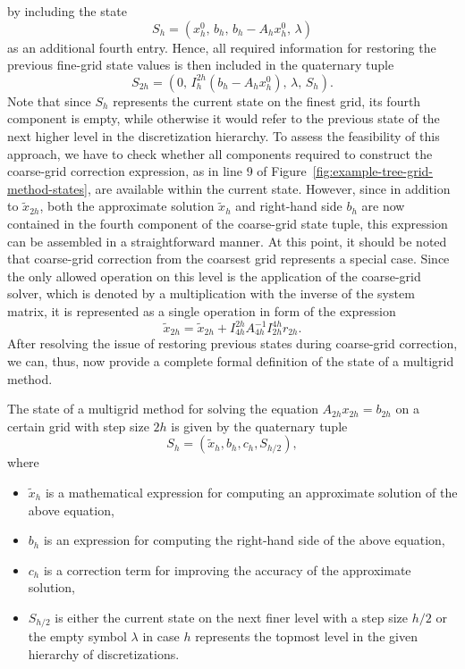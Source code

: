 by including the state 
\begin{equation*}
S_h = (x_{h}^0, \, b_h, \, b_{h} - A_h x_{h}^0, \, \lambda) 
\end{equation*} 
as an additional fourth entry. 
Hence, all required information for restoring the previous fine-grid state values is then included in the quaternary tuple 
\begin{equation*}
	S_{2h} = (0, \, I_{h}^{2h}(b_{h} - A_h x_{h}^0), \, \lambda, \, S_h).
\end{equation*}
Note that since $S_h$ represents the current state on the finest grid, its fourth component is empty, while otherwise it would refer to the previous state of the next higher level in the discretization hierarchy.
To assess the feasibility of this approach, we have to check whether all components required to construct the coarse-grid correction expression, as in line 9 of Figure~\ref{fig:example-tree-grid-method-states}, are available within the current state.
However, since in addition to $\tilde{x}_{2h}$, both the approximate solution $\tilde{x}_h$ and right-hand side $b_h$ are now contained in the fourth component of the coarse-grid state tuple, this expression can be assembled in a straightforward manner.
At this point, it should be noted that coarse-grid correction from the coarsest grid represents a special case. 
Since the only allowed operation on this level is the application of the coarse-grid solver, which is denoted by a multiplication with the inverse of the system matrix, it is represented as a single operation in form of the expression 
\begin{equation*}
	\tilde{x}_{2h} = \tilde{x}_{2h} + I_{4h}^{2h} A_{4h}^{-1} I_{2h}^{4h} r_{2h}.
\end{equation*}
After resolving the issue of restoring previous states during coarse-grid correction, we can, thus, now provide a complete formal definition of the state of a multigrid method.
\begin{definition}
\label{def:multigrid-state}
The state of a multigrid method for solving the equation $A_{2h} x_{2h} = b_{2h}$ on a certain grid with step size $2h$ is given by the quaternary tuple
\begin{equation*}
	S_{h} = \left( \tilde{x}_{h}, b_{h}, c_{h}, S_{h/2}\right), 
\end{equation*}
where
\begin{itemize}
	\item $\tilde{x}_{h}$ is a mathematical expression for computing an approximate solution of the above equation,
	\item $b_{h}$ is an expression for computing the right-hand side of the above equation,
	\item $c_{h}$ is a correction term for improving the accuracy of the approximate solution,
	\item $S_{h/2}$ is either the current state on the next finer level with a step size $h/2$ or the empty symbol $\lambda$ in case $h$ represents the topmost level in the given hierarchy of discretizations.
\end{itemize}
\end{definition}
